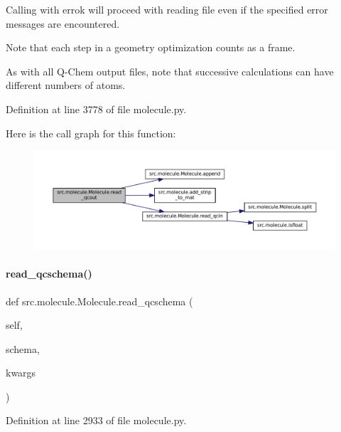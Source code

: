 Calling with errok will proceed with reading file even if the specified error messages are encountered.

Note that each step in a geometry optimization counts as a frame.

As with all Q-\/\+Chem output files, note that successive calculations can have different numbers of atoms. 

Definition at line 3778 of file molecule.\+py.

Here is the call graph for this function\+:
\nopagebreak
\begin{figure}[H]
\begin{center}
\leavevmode
\includegraphics[width=350pt]{classsrc_1_1molecule_1_1Molecule_a243cce870c970db8cac7f102325e872b_cgraph}
\end{center}
\end{figure}
\mbox{\label{classsrc_1_1molecule_1_1Molecule_a1b0681641dfbba1c2d182151b5e60f5d}} 
\paragraph{\texorpdfstring{read\+\_\+qcschema()}{read\_qcschema()}}
{\footnotesize\ttfamily def src.\+molecule.\+Molecule.\+read\+\_\+qcschema (\begin{DoxyParamCaption}\item[{}]{self,  }\item[{}]{schema,  }\item[{}]{kwargs }\end{DoxyParamCaption})}



Definition at line 2933 of file molecule.\+py.

\mbox{\label{classsrc_1_1molecule_1_1Molecule_a6c78338a640dbf1fd95c38f980203643}} 
